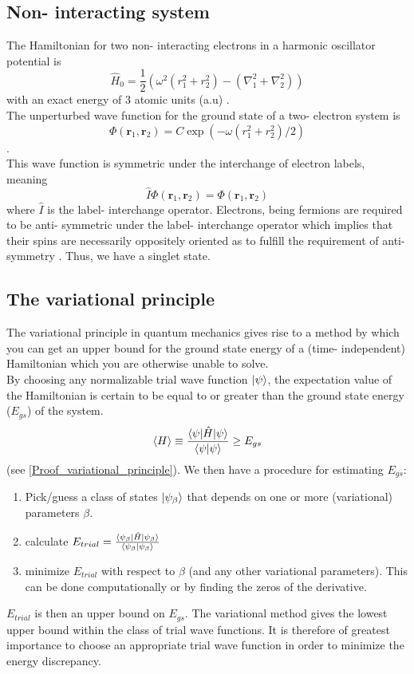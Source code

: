 \documentclass[10pt,a4paper]{article}
\begin{document}
\subsection{Non- interacting system}
The Hamiltonian for two non- interacting electrons in a harmonic oscillator potential is
\begin{equation}
\hat{H}_{0} = \frac{1}{2}\left( \omega^2   \left( r_1^2+r_2^2 \right)-\left( \nabla_1^2 + \nabla_2^2 \right)  \right)
\end{equation}
with an exact energy of 3 atomic units (a.u) \cite{Problem_set_5}.\\The unperturbed wave function for the ground state of a two- electron system is 
\begin{equation*}
\Phi(\mathbf{r}_1,\mathbf{r}_2) = C\exp{\left(-\omega(r_1^2+r_2^2)/2\right)}
\end{equation*}
\cite{Problem_set_5}.\\This wave function is symmetric under the interchange of electron labels, meaning
\begin{equation*}
\hat{I}\Phi(\mathbf{r}_1,\mathbf{r}_2) = \Phi(\mathbf{r}_1,\mathbf{r}_2)
\end{equation*}
where $\hat{I}$ is the label- interchange operator. Electrons, being fermions are required to be anti- symmetric under the label- interchange operator which implies that their spins are necessarily oppositely oriented as to fulfill the requirement of anti-symmetry \cite{griffiths2018introduction}. Thus, we have a singlet state.
\subsection{The variational principle}
The variational principle in quantum mechanics gives rise to a method by which you can get an upper bound for the ground state energy of a (time- independent) Hamiltonian which you are otherwise unable to solve.\\ 
By choosing any normalizable trial wave function $\ket{\psi}$, the expectation value of the Hamiltonian is certain to be equal to or greater than the ground state energy ($E_{gs}$) of the system.
$$
\braket{H}\equiv \frac{\braket{\psi|\hat{H}|\psi}}{\braket{\psi|\psi}} \geq E_{gs}
$$
(see \ref{Proof_variational_principle}). We then have a procedure for estimating $E_{gs}$:
\begin{enumerate}
\item Pick/guess a class of states $\ket{\psi_\beta}$ that depends on one or more (variational) parameters $\beta$.
\item calculate $E_{trial}=\frac{\braket{\psi_\beta|\hat{H}|\psi_\beta}}{\braket{\psi_\beta|\psi_\beta}}$
\item minimize $E_{trial}$ with respect to $\beta$ (and any other variational parameters). This can be done computationally or by finding the zeros of the derivative.
\end{enumerate}
$E_{trial}$ is then an upper bound on $E_{gs}$. The variational method gives the lowest upper bound within the class of trial wave functions. It is therefore of greatest importance to choose an appropriate trial wave function in order to minimize the energy discrepancy.
\end{document}
